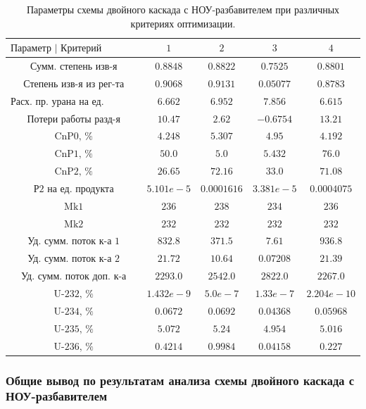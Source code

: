 \begin{table}
    \begin{tabular}{ccccc}
        $\text{Параметр | Критерий оптимизации}$ & $\text{1}$ & $\text{2}$ & $\text{3}$ & $\text{4}$\\ \hline
        $\text{Сумм. степень изв-я}$ & $0.8848$ & $0.8822$ & $0.7525$ & $0.8801$\\ \hline
        $\text{Степень изв-я из рег-та}$ & $0.9068$ & $0.9131$ & $0.05077$ & $0.8783$\\ \hline
        $\text{Расх. пр. урана на ед. продукта}$ & $6.662$ & $6.952$ & $7.856$ & $6.615$\\ \hline
        $\text{Потери работы разд-я}$ & $10.47$ & $2.62$ & $-0.6754$ & $13.21$\\ \hline
        $\text{CnP0, \%}$ & $4.248$ & $5.307$ & $4.95$ & $4.192$\\ \hline
        $\text{CnP1, \%}$ & $50.0$ & $5.0$ & $5.432$ & $76.0$\\ \hline
        $\text{CnP2, \%}$ & $26.65$ & $72.16$ & $33.0$ & $71.08$\\ \hline
        $\text{Р2 на ед. продукта}$ & $5.101e-5$ & $0.0001616$ & $3.381e-5$ & $0.0004075$\\ \hline
        $\text{Mk1}$ & $236$ & $238$ & $234$ & $236$\\ \hline
        $\text{Mk2}$ & $232$ & $232$ & $232$ & $232$\\ \hline
        $\text{Уд. сумм. поток к-а 1}$ & $832.8$ & $371.5$ & $7.61$ & $936.8$\\ \hline
        $\text{Уд. сумм. поток к-а 2}$ & $21.72$ & $10.64$ & $0.07208$ & $21.39$\\ \hline
        $\text{Уд. сумм. поток доп. к-а}$ & $2293.0$ & $2542.0$ & $2822.0$ & $2267.0$\\ \hline
        $\text{U-232, \%}$ & $1.432e-9$ & $5.0e-7$ & $1.33e-7$ & $2.204e-10$\\ \hline
        $\text{U-234, \%}$ & $0.0672$ & $0.0692$ & $0.04368$ & $0.05968$\\ \hline
        $\text{U-235, \%}$ & $5.072$ & $5.24$ & $4.954$ & $5.016$\\ \hline
        $\text{U-236, \%}$ & $0.4214$ & $0.9984$ & $0.04158$ & $0.227$
        \end{tabular}
\caption{Параметры схемы двойного каскада с НОУ-разбавителем при различных критериях оптимизации.{\label{2opt5}}}
\end{table}


\subsubsection{Общие вывод по результатам анализа схемы двойного каскада с НОУ-разбавителем}



